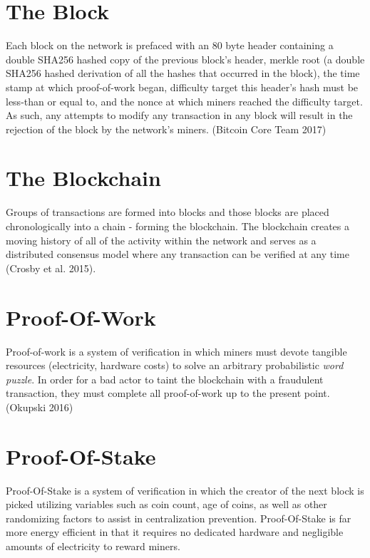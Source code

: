 \documentclass[11pt,a4paperpaper,]{report}
\begin{document}
\section{The Block}\label{the-block}

Each block on the network is prefaced with an 80 byte header containing
a double SHA256 hashed copy of the previous block's header, merkle root
(a double SHA256 hashed derivation of all the hashes that occurred in
the block), the time stamp at which proof-of-work began, difficulty
target this header's hash must be less-than or equal to, and the nonce
at which miners reached the difficulty target. As such, any attempts to
modify any transaction in any block will result in the rejection of the
block by the network's miners. (Bitcoin Core Team 2017)

\section{The Blockchain}\label{the-blockchain}

Groups of transactions are formed into blocks and those blocks are
placed chronologically into a chain - forming the blockchain. The
blockchain creates a moving history of all of the activity within the
network and serves as a distributed consensus model where any
transaction can be verified at any time (Crosby et al. 2015).

\section{Proof-Of-Work}\label{proof-of-work}

Proof-of-work is a system of verification in which miners must devote
tangible resources (electricity, hardware costs) to solve an arbitrary
probabilistic \textit{word puzzle}. In order for a bad actor to taint
the blockchain with a fraudulent transaction, they must complete all
proof-of-work up to the present point. (Okupski 2016)

\section{Proof-Of-Stake}\label{proof-of-stake}

Proof-Of-Stake is a system of verification in which the creator of the
next block is picked utilizing variables such as coin count, age of
coins, as well as other randomizing factors to assist in centralization
prevention. Proof-Of-Stake is far more energy efficient in that it
requires no dedicated hardware and negligible amounts of electricity to
reward miners.
\end{document}
